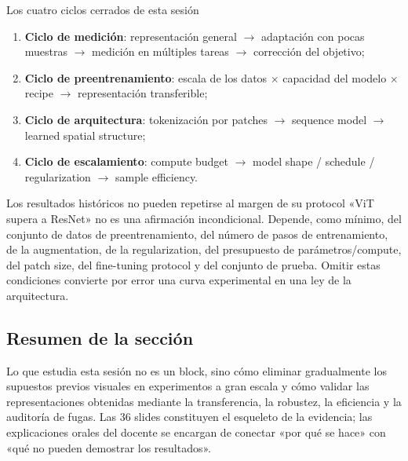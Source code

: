 \begin{importantbox}{Los cuatro ciclos cerrados de esta sesión}
\begin{enumerate}
  \item \textbf{Ciclo de medición}: representación general $\rightarrow$ adaptación con pocas muestras $\rightarrow$ medición en múltiples tareas $\rightarrow$ corrección del objetivo;
  \item \textbf{Ciclo de preentrenamiento}: escala de los datos $\times$ capacidad del modelo $\times$ recipe $\rightarrow$ representación transferible;
  \item \textbf{Ciclo de arquitectura}: tokenización por patches $\rightarrow$ sequence model $\rightarrow$ learned spatial structure;
  \item \textbf{Ciclo de escalamiento}: compute budget $\rightarrow$ model shape / schedule / regularization $\rightarrow$ sample efficiency.
\end{enumerate}
\end{importantbox}

\begin{warningbox}{Los resultados históricos no pueden repetirse al margen de su protocol}
«ViT supera a ResNet» no es una afirmación incondicional. Depende, como mínimo, del conjunto de datos de preentrenamiento, del número de pasos de entrenamiento, de la augmentation, de la regularization, del presupuesto de parámetros/compute, del patch size, del fine-tuning protocol y del conjunto de prueba. Omitir estas condiciones convierte por error una curva experimental en una ley de la arquitectura.
\end{warningbox}

\subsection{Resumen de la sección}

Lo que estudia esta sesión no es un block, sino cómo eliminar gradualmente los supuestos previos visuales en experimentos a gran escala y cómo validar las representaciones obtenidas mediante la transferencia, la robustez, la eficiencia y la auditoría de fugas. Las 36 slides constituyen el esqueleto de la evidencia; las explicaciones orales del docente se encargan de conectar «por qué se hace» con «qué no pueden demostrar los resultados».
